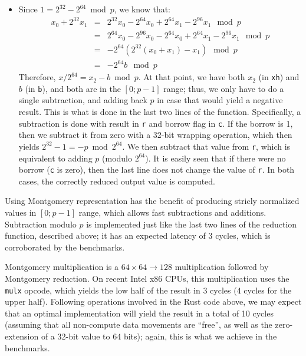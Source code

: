 \documentclass{llncs}
\begin{document}
\begin{itemize}
    \item Since $1 = 2^{32} - 2^{64} \bmod p$, we know that:
    \begin{eqnarray*}
        x_0 + 2^{32} x_1 &=& 2^{32} x_0 - 2^{64} x_0
                             + 2^{64} x_1 - 2^{96} x_1 \mod p \\
                         &=& 2^{64} x_0 - 2^{96} x_0 - 2^{64} x_0
                             + 2^{64} x_1 - 2^{96} x_1 \mod p \\
                         &=& -2^{64} (2^{32} (x_0 + x_1) - x_1) \mod p \\
                         &=& -2^{64} b \mod p
    \end{eqnarray*}
    Therefore, $x/2^{64} = x_2 - b \bmod p$. At that point, we have both
    $x_2$ (in \verb+xh+) and $b$ (in \verb+b+), and both are in the
    $[0;p-1]$ range; thus, we only have to do a single subtraction, and
    adding back $p$ in case that would yield a negative result. This is
    what is done in the last two lines of the function. Specifically,
    a subtraction is done with result in \verb+r+ and borrow flag in
    \verb+c+. If the borrow is 1, then we subtract it from zero with
    a 32-bit wrapping operation, which then yields
    $2^{32}-1 = -p \bmod 2^{64}$. We then subtract that value from
    \verb+r+, which is equivalent to adding $p$ (modulo $2^{64}$). It
    is easily seen that if there were no borrow (\verb+c+ is zero),
    then the last line does not change the value of \verb+r+. In both
    cases, the correctly reduced output value is computed.

\end{itemize}

Using Montgomery representation has the benefit of producing stricly
normalized values in $[0;p-1]$ range, which allows fast subtractions and
additions. Subtraction modulo $p$ is implemented just like the last two
lines of the reduction function, described above; it has an expected
latency of 3 cycles, which is corroborated by the benchmarks.

Montgomery multiplication is a $64\times 64\rightarrow 128$
multiplication followed by Montgomery reduction. On recent Intel x86
CPUs, this multiplication uses the \verb+mulx+ opcode, which yields the
low half of the result in 3 cycles (4 cycles for the upper half).
Following operations involved in the Rust code above, we may expect that
an optimal implementation will yield the result in a total of 10 cycles
(assuming that all non-compute data movements are ``free'', as well as
the zero-extension of a 32-bit value to 64 bits); again, this is what we
achieve in the benchmarks.
\end{document}
